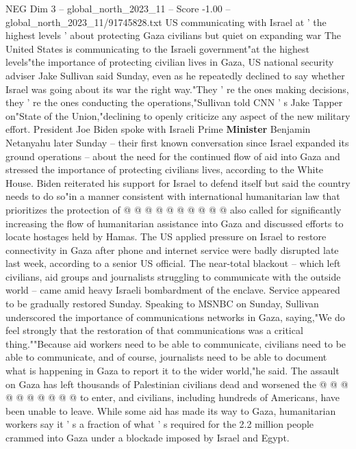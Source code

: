 \begin{textsample}{NEG Dim 3 – global\_north\_2023\_11 – Score -1.00 – global\_north\_2023\_11/91745828.txt}  \label{ex:f3_neg_286}
US communicating with Israel at ' the highest levels ' about protecting Gaza civilians but quiet on expanding war The United States is communicating to the Israeli government"at the highest levels"the importance of protecting civilian lives in Gaza, US national security adviser Jake Sullivan said Sunday, even as he repeatedly declined to say whether Israel was going about its war the right way."They ' re the ones making decisions, they ' re the ones conducting the operations,"Sullivan told CNN ' s Jake Tapper on"State of the Union,"declining to openly criticize any aspect of the new military effort.
President Joe Biden spoke with Israeli Prime \textbf{Minister} Benjamin Netanyahu later Sunday -- their first known conversation since Israel expanded its ground operations -- about the need for the continued flow of aid into Gaza and stressed the importance of protecting civilians lives, according to the White House.
Biden reiterated his support for Israel to defend itself but said the country needs to do so"in a manner consistent with international humanitarian law that prioritizes the protection of @ @ @ @ @ @ @ @ @ @ also called for significantly increasing the flow of humanitarian assistance into Gaza and discussed efforts to locate hostages held by Hamas.
The US applied pressure on Israel to restore connectivity in Gaza after phone and internet service were badly disrupted late last week, according to a senior US official.
The near-total blackout -- which left civilians, aid groups and journalists struggling to communicate with the outside world -- came amid heavy Israeli bombardment of the enclave.
Service appeared to be gradually restored Sunday.
Speaking to MSNBC on Sunday, Sullivan underscored the importance of communications networks in Gaza, saying,"We do feel strongly that the restoration of that communications was a critical thing.""Because aid workers need to be able to communicate, civilians need to be able to communicate, and of course, journalists need to be able to document what is happening in Gaza to report it to the wider world,"he said.
The assault on Gaza has left thousands of Palestinian civilians dead and worsened the @ @ @ @ @ @ @ @ @ @ to enter, and civilians, including hundreds of Americans, have been unable to leave.
While some aid has made its way to Gaza, humanitarian workers say it ' s a fraction of what ' s required for the 2.2 million people crammed into Gaza under a blockade imposed by Israel and Egypt.

\end{textsample}
